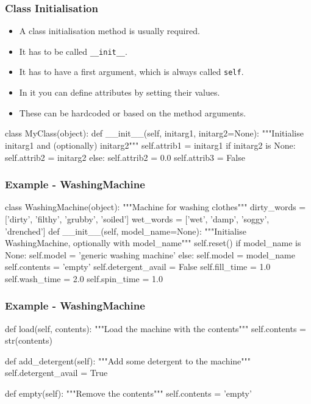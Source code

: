 \documentclass{beamer}
\begin{document}
\begin{frame}[fragile]
\frametitle{Class Initialisation}
\begin{itemize}
\item A class initialisation method is usually required.
\item It has to be called \lstinline|__init__|.
\item It has to have a first argument, which is always called \lstinline|self|.
\item In it you can define attributes by setting their values.
\item These can be hardcoded or based on the method arguments.
\end{itemize}

\begin{code}
class MyClass(object):
  def __init__(self, initarg1, initarg2=None):
    """Initialise initarg1 and (optionally) initarg2"""
    self.attrib1 = initarg1
    if initarg2 is None:
      self.attrib2 = initarg2
    else:
      self.attrib2 = 0.0
    self.attrib3 = False
\end{code}

\end{frame}

\begin{frame}[fragile]
\frametitle{Example - WashingMachine}
\begin{code}
class WashingMachine(object):
    """Machine for washing clothes"""
    dirty_words = ['dirty', 'filthy', 'grubby', 'soiled']
    wet_words = ['wet', 'damp', 'soggy', 'drenched']
    def __init__(self, model_name=None):
        """Initialise WashingMachine, optionally with model_name"""
        self.reset()
        if model_name is None:
            self.model = 'generic washing machine'
        else:
            self.model = model_name
        self.contents = 'empty'
        self.detergent_avail = False
        self.fill_time = 1.0
        self.wash_time = 2.0
        self.spin_time = 1.0
\end{code}
\end{frame}

\begin{frame}[fragile]
\frametitle{Example - WashingMachine}
\begin{code}
    def load(self, contents):
        """Load the machine with the contents"""
        self.contents = str(contents)
        
    def add_detergent(self):
        """Add some detergent to the machine"""
        self.detergent_avail = True
        
    def empty(self):
        """Remove the contents"""
        self.contents = 'empty'
\end{code}
\end{frame}
\end{document}
